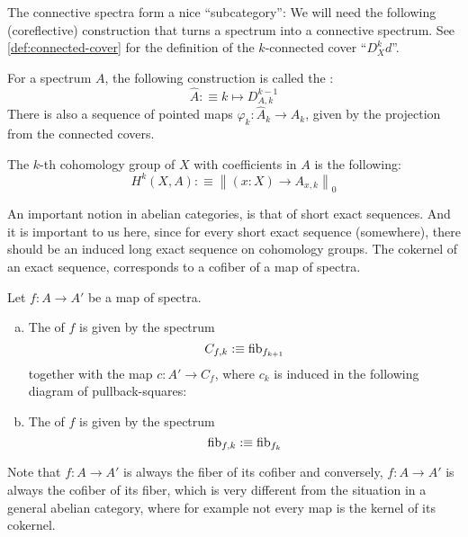 The connective spectra form a nice ``subcategory'':
We will need the following (coreflective) construction that turns a spectrum into a connective spectrum.
See \cref{def:connected-cover} for the definition of the $k$-connected cover ``$D^k_Xd$''.

\begin{definition}
  For a spectrum $A$,
  the following construction is called the :
  \[ \hat{A}:\equiv k\mapsto D_{A,k}^{k-1}\]
  There is also a sequence of pointed maps $\varphi_k:\hat{A}_k\to A_k$, given by the projection from the connected covers.
\end{definition}

\begin{definition}
  The $k$-th cohomology group of $X$ with coefficients in $A$ is the following:
  \[ H^k(X,A):\equiv\left\|(x:X)\to A_{x,k}\right\|_0 \]
\end{definition}

An important notion in abelian categories, is that of short exact sequences.
And it is important to us here, since for every short exact sequence (somewhere), there should be an induced long exact sequence on cohomology groups.
The cokernel of an exact sequence, corresponds to a cofiber of a map of spectra.

\begin{definition}
  Let $f:A\to A'$ be a map of spectra.
  \begin{enumerate}[(a)]
  \item The  of $f$ is given by the spectrum
    \[ C_{f,k}:\equiv \mathrm{fib}_{f_{k+1}}\]
    together with the map $c:A'\to C_f$, where $c_k$ is induced in the following diagram of pullback-squares:
    \begin{center}
    \end{center}
  \item The  of $f$ is given by the spectrum
    \[ \mathrm{fib}_{f,k}:\equiv \mathrm{fib}_{f_k}\]
  \end{enumerate}
\end{definition}

Note that $f:A\to A'$ is always the fiber of its cofiber and conversely, $f:A\to A'$ is always the cofiber of its fiber, which is very different from the situation in a general abelian category,
where for example not every map is the kernel of its cokernel.

